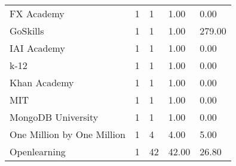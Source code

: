 \documentclass[
	a4paper,
	pdftex,
	12pt,	
	footinclude=true,
	fleqn,
	final,
	]{report}%
\begin{document}
\begin{table}[h]
{\begin{tabular}{m{7cm} m{2.3cm} m{2.3cm} m{2.3cm} m{2.3cm}}
FX Academy                    & 1                                                    & 1                                                     & 1.00                                                     & 0.00                                                     \\
GoSkills                      & 1                                                    & 1                                                     & 1.00                                                     & 279.00                                                   \\
IAI Academy                   & 1                                                    & 1                                                     & 1.00                                                     & 0.00                                                     \\
k-12                          & 1                                                    & 1                                                     & 1.00                                                     & 0.00                                                     \\
Khan Academy                  & 1                                                    & 1                                                     & 1.00                                                     & 0.00                                                     \\
MIT                           & 1                                                    & 1                                                     & 1.00                                                     & 0.00                                                     \\
MongoDB University            & 1                                                    & 1                                                     & 1.00                                                     & 0.00                                                     \\
One Million by One Million    & 1                                                    & 4                                                     & 4.00                                                     & 5.00                                                     \\
Openlearning                  & 1                                                    & 42                                                    & 42.00                                                    & 26.80                                                    \\ \midrule

\end{tabular}}
\end{table}
\end{document}
